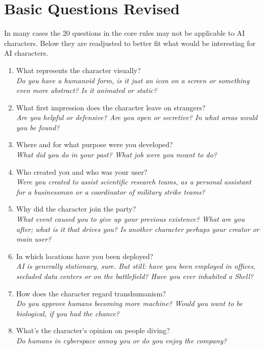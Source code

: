 \documentclass[12pt,a4paper,openany,usenames,dvipsnames]{book}
\begin{document}
	\section{Basic Questions Revised}
	In many cases the 20 questions in the core rules may not be applicable to AI characters. Below they are readjusted to better fit what would be interesting for AI characters.
	\begin{multicols}{2}
	\begin{enumerate}
		\setlength\itemsep{-6mm}
		\item What represents the character visually?\\
		\textit{Do you have a humanoid form, is it just an icon on a screen or something even more abstract? Is it animated or static?}
		\item What first impression does the character leave on strangers?\\
		\textit{Are you helpful or defensive? Are you open or secretive? In what areas would you be found?}
		\item Where and for what purpose were you developed?\\
		\textit{What did you do in your past? What job were you meant to do?}
		\item Who created you and who was your user?\\
		\textit{Were you created to assist scientific research teams, as a personal assistant for a businessman or a coordinator of military strike teams?}
		\item Why did the character join the party?\\
		\textit{What event caused you to give up your previous existence? What are you after; what is it that drives you? Is another character perhaps your creator or main user?}
		\item In which locations have you been deployed?\\
		\textit{AI is generally stationary, sure. But still: have you been employed in offices, secluded data centers or on the battlefield? Have you ever inhabited a Shell?}
		\item How does the character regard transhumanism?\\
		\textit{Do you approve humans becoming more machine? Would you want to be biological, if you had the chance?}
		\item What’s the character’s opinion on people diving?\\
		\textit{Do humans in cyberspace annoy you or do you enjoy the company?}

\end{enumerate}
\end{multicols}
\end{document}
